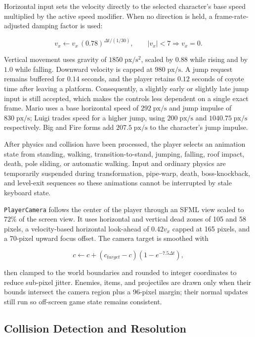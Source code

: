 \documentclass{template}
\begin{document}
Horizontal input sets the velocity directly to the selected character's base
speed multiplied by the active speed modifier. When no direction is held, a
frame-rate-adjusted damping factor is used:

\[
    v_x \leftarrow v_x\,(0.78)^{\Delta t/(1/30)},
    \qquad |v_x| < 7 \Longrightarrow v_x = 0.
\]

Vertical movement uses gravity of $1850\;\mathrm{px/s^2}$, scaled by $0.88$
while rising and by $1.0$ while falling. Downward velocity is capped at
$980\;\mathrm{px/s}$. A jump request remains buffered for $0.14$ seconds, and
the player retains $0.12$ seconds of coyote time after leaving a platform.
Consequently, a slightly early or slightly late jump input is still accepted,
which makes the controls less dependent on a single exact frame. Mario uses a
base horizontal speed of $292\;\mathrm{px/s}$ and jump impulse of
$830\;\mathrm{px/s}$; Luigi trades speed for a higher jump, using
$200\;\mathrm{px/s}$ and $1040.75\;\mathrm{px/s}$ respectively. Big and Fire
forms add $207.5\;\mathrm{px/s}$ to the character's jump impulse.

After physics and collision have been processed, the player selects an
animation state from standing, walking, transition-to-stand, jumping, falling,
roof impact, death, pole sliding, or automatic walking. Input and ordinary
physics are temporarily suspended during transformation, pipe-warp, death,
boss-knockback, and level-exit sequences so these animations cannot be
interrupted by stale keyboard state.

\texttt{PlayerCamera} follows the center of the player through an SFML view
scaled to $72\%$ of the screen view. It uses horizontal and vertical dead zones
of 105 and 58 pixels, a velocity-based horizontal look-ahead of
$0.42v_x$ capped at 165 pixels, and a 70-pixel upward focus offset. The camera
target is smoothed with

\[
    c \leftarrow c + (c_{target}-c)
        \left(1-e^{-7.5\Delta t}\right),
\]

then clamped to the world boundaries and rounded to integer coordinates to
reduce sub-pixel jitter. Enemies, items, and projectiles are drawn only when
their bounds intersect the camera region plus a 96-pixel margin; their normal
updates still run so off-screen game state remains consistent.

\subsection{Collision Detection and Resolution}
\end{document}

